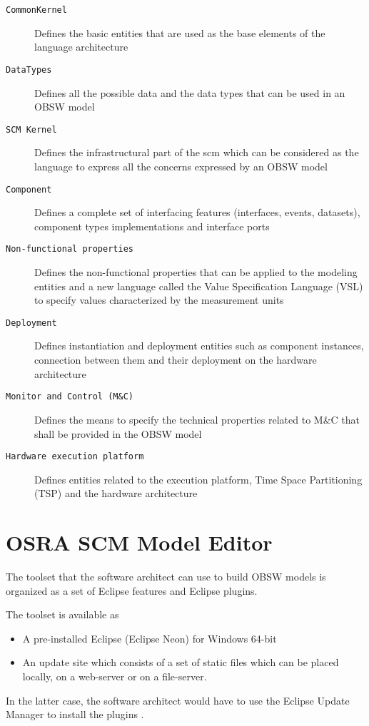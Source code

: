 \begin{description}
\item [\texttt{CommonKernel}] Defines the basic entities that are used as the base elements of the language architecture
\item [\texttt{DataTypes}] Defines all the possible data and the data types that can be used in an OBSW model
\item [\texttt{SCM Kernel}] Defines the infrastructural part of the \ac{scm} which can be considered as the language to express all the concerns expressed by an OBSW model
\item [\texttt{Component}] Defines a complete set of interfacing features (interfaces, events, datasets), component types implementations and interface ports
\item [\texttt{Non-functional properties}] Defines the non-functional properties that can be applied to the modeling entities and a new language called the Value Specification Language (VSL) to specify values characterized by the measurement units
\item [\texttt{Deployment}] Defines instantiation and deployment entities such as component instances, connection between them and their deployment on the hardware architecture
\item [\texttt{Monitor and Control (M\&C)}] Defines the means to specify the technical properties related to M\&C that shall be provided in the OBSW model
\item [\texttt{Hardware execution platform}] Defines entities related to the execution platform, Time Space Partitioning (TSP) and the hardware architecture   
\end{description}

\section{OSRA SCM Model Editor}
\label{section: OSRA editor} 
The toolset that the software architect can use to build OBSW models is organized as a set of Eclipse features and Eclipse plugins. 

The toolset is available as
\begin{itemize}
\item A pre-installed Eclipse (Eclipse Neon) for Windows 64-bit  
\item An update site which consists of a set of static files which can be placed locally, on a web-server or on a file-server. 
\end{itemize}
In the latter case, the software architect would have to use the Eclipse Update Manager to install the plugins \cite{OSRAEditor}. 

